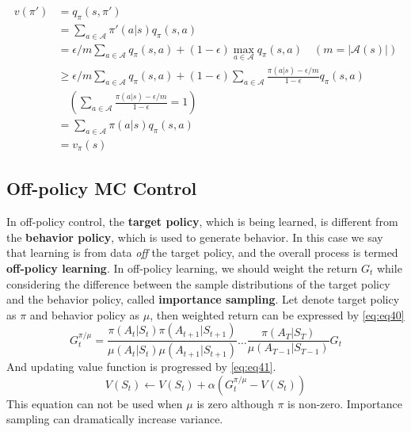 \documentclass[
	10pt, %
]{article}
\theoremstyle{plain}
\newcommand{\mc}[1]{\mathcal{#1}}
\newcommand{\tb}[1]{\textbf{#1}}
\newcommand{\ti}[1]{\textit{#1}}
\numberwithin{equation}{subsection} %
\begin{document}
\begin{equation} \label{eq:eq39}
    \begin{aligned}
        v(\pi') &= q_\pi(s, \pi') \\
        &= \sum_{a \in \mc{A}} \pi'(a|s)q_\pi(s,a) \\
        &= \epsilon/m \sum_{a \in \mc{A}} q_\pi(s,a) + (1-\epsilon) \max_{a \in \mc{A}}q_\pi(s,a) \quad (m=|\mc{A}(s)|) \\
        &\geq \epsilon / m \sum_{a \in \mc{A}}q_\pi(s,a) + (1-\epsilon)\sum_{a \in \mc{A}}\frac{\pi(a|s) - \epsilon / m}{1 - \epsilon}q_\pi(s,a)\\ 
        &\quad \left(\sum_{a \in \mc{A}}\frac{\pi(a|s) - \epsilon /m}{1-\epsilon} =1\right)\\
        &= \sum_{a \in \mc{A}}\pi(a|s)q_\pi(s,a) \\
        &= v_\pi(s)
    \end{aligned}
\end{equation}


\subsection{Off-policy MC Control}
In off-policy control, the \tb{target policy}, which is being learned, is different from the \tb{behavior policy}, which is used to generate behavior. 
In this case we say that learning is from data \ti{off} the target policy, and the overall process is termed \tb{off-policy learning}.
In off-policy learning, we should weight the return $G_t$ while considering the difference between the sample distributions of the target policy and the behavior policy, called \tb{importance sampling}.
Let denote target policy as $\pi$ and behavior policy as $\mu$, then weighted return can be expressed by \cref{eq:eq40}
\begin{equation} \label{eq:eq40}
    G^{\pi / \mu}_{t} = \frac{\pi(A_t|S_t)\pi(A_{t+1}|S_{t+1})}{\mu(A_t|S_t)\mu(A_{t+1}|S_{t+1})}\dots\frac{\pi(A_T|S_T)}{\mu(A_{T-1}|S_{T-1})}G_t
\end{equation}
And updating value function is progressed by \cref{eq:eq41}.
\begin{equation} \label{eq:eq41}
    V(S_t) \gets V(S_t) + \alpha (G^{\pi / \mu}_t - V(S_t))
\end{equation}
This equation can not be used when $\mu$ is zero although $\pi$ is non-zero.
Importance sampling can dramatically increase variance.

\end{document}
